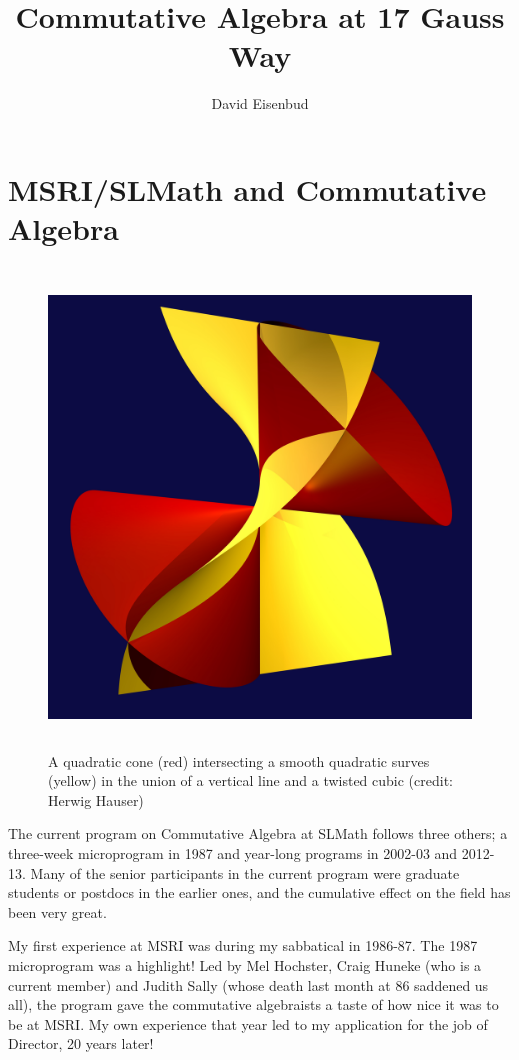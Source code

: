 \documentclass[11pt, oneside]{article}   	%
\title{Commutative Algebra at 17 Gauss Way}
\author{David Eisenbud}
\begin{document}
\maketitle

\section{MSRI/SLMath and Commutative Algebra}

\begin{figure}\label{cubicAndLine}
\centerline {\includegraphics[height=5in]{"main/Fig15-1-TwistAndShout"}}
 \caption{A quadratic cone (red) intersecting a smooth quadratic surves (yellow) in the union of a vertical line and a twisted cubic (credit: Herwig Hauser)}
\end{figure}

The current program on Commutative Algebra at SLMath follows three others; a three-week microprogram in 1987 and year-long programs in 2002-03 and 2012-13. Many of the senior participants in the current program were graduate students or postdocs in the earlier ones, and the cumulative effect on the field has been very great.

My first experience at MSRI was during my sabbatical in 1986-87. The 1987 microprogram was a highlight! Led by Mel Hochster, Craig Huneke (who is a current member) and Judith Sally (whose death last month at 86 saddened us all), the program gave the commutative algebraists a taste of how nice it was to be at MSRI. My own experience that year led to my application for the job of Director, 20 years later!
\end{document}
